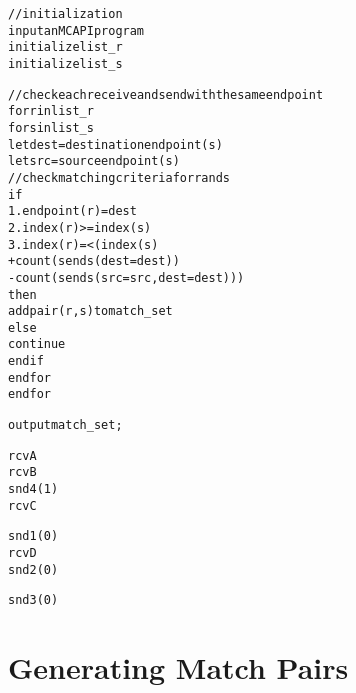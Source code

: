 
\newsavebox{\boxalgorithm}
\begin{lrbox}{\boxalgorithm}
\begin{minipage}[c]{1.4\linewidth}
\begin{alltt}
// initialization
input an MCAPI program
initialize list_r
initialize list_s

// check each receive and send with the same endpoint
for r in list_r
  for s in list_s
    let dest = destination endpoint(s)
    let src = source endpoint(s)
    // check matching criteria for r and s
    if
      1. endpoint(r) = dest
      2. index(r) >= index(s)
      3. index(r) =< (index(s)
                     + count(sends(dest=dest))
                     - count(sends(src=src, dest=dest)))
    then
      add pair (r, s) to match_set
    else
      continue
    end if
  end for
end for

output match_set;
\end{alltt}
\end{minipage}
\end{lrbox}

\newsavebox{\boxtaskzero}
\begin{lrbox}{\boxtaskzero}
\begin{minipage}[t]{0.2\linewidth}
\begin{alltt}
rcvA
rcvB
snd4(1)
rcvC
\end{alltt}
\end{minipage}
\end{lrbox}

\newsavebox{\boxtaskone}
\begin{lrbox}{\boxtaskone}
\begin{minipage}[t]{0.2\linewidth}
\begin{alltt}
snd1(0)
rcvD
snd2(0)
\end{alltt}
\end{minipage}
\end{lrbox}

\newsavebox{\boxtasktwo}
\begin{lrbox}{\boxtasktwo}
\begin{minipage}[t]{0.2\linewidth}
\begin{alltt}
snd3(0)
\end{alltt}
\end{minipage}
\end{lrbox}

\section{Generating Match Pairs} \label{sec:mp-gen}


